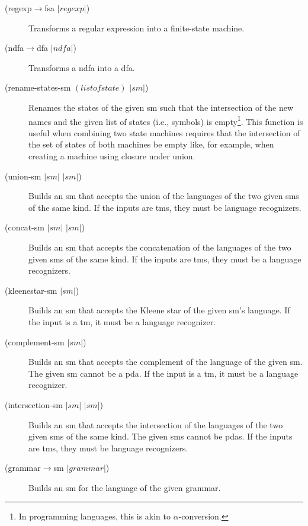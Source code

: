 \documentclass{eptcs}
\begin{document}
\begin{description}
   \item [(regexp$\rightarrow$fsa $|\mathit{regexp}|$)] Transforms a regular expression into a finite-state machine.

   \item [(ndfa$\rightarrow$dfa $|\mathit{ndfa}|$)] Transforms a \textsf{ndfa} into a \textsf{dfa}.

   \item [(rename-states-sm $(\mathit{listof} \mathit{state})$ $|\mathit{sm}|$)] Renames the states of the given \textsf{sm} such that the intersection of the new names and the given list of states (i.e., symbols) is empty\footnote{In programming languages, this is akin to $\alpha$-conversion.}. This function is useful when combining two state machines requires that the intersection of the set of states of both machines be empty like, for example, when creating a machine using closure under union.

   \item [(union-sm $|\mathit{sm}|$ $|\mathit{sm}|$)] Builds an \textsf{sm} that accepts the union of the languages of the two given \textsf{sm}s of the same kind. If the inputs are \textsf{tm}s, they must be language recognizers.

   \item [(concat-sm $|\mathit{sm}|$ $|\mathit{sm}|$)] Builds an \textsf{sm} that accepts the concatenation of the languages of the two given \textsf{sm}s of the same kind. If the inputs are \textsf{tm}s, they must be a language recognizers.

   \item [(kleenestar-sm $|\mathit{sm}|$)] Builds an \textsf{sm} that accepts the Kleene star of the given \textsf{sm}'s language. If the input is a \textsf{tm}, it must be a language recognizer.

   \item [(complement-sm $|\mathit{sm}|$)] Builds an \textsf{sm} that accepts the complement of the language of the given \textsf{sm}. The given \textsf{sm} cannot be a \textsf{pda}. If the input is a \textsf{tm}, it must be a language recognizer.

   \item [(intersection-sm $|\mathit{sm}|$ $|\mathit{sm}|$)] Builds an \textsf{sm} that accepts the intersection of the languages of the two given \textsf{sm}s of the same kind. The given \textsf{sm}s cannot be \textsf{pda}s. If the inputs are \textsf{tm}s, they must be language recognizers.

   \item [(grammar$\rightarrow$sm $|\mathit{grammar}|$)] Builds an \textsf{sm} for the language of the given grammar.
\end{description}
\end{document}
